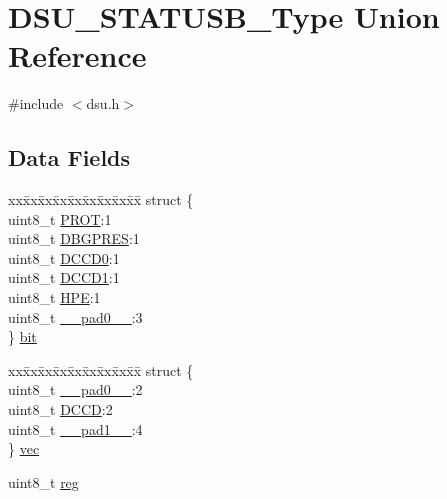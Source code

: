 \hypertarget{union_d_s_u___s_t_a_t_u_s_b___type}{}\section{D\+S\+U\+\_\+\+S\+T\+A\+T\+U\+S\+B\+\_\+\+Type Union Reference}
\label{union_d_s_u___s_t_a_t_u_s_b___type}


{\ttfamily \#include $<$dsu.\+h$>$}

\subsection*{Data Fields}
\begin{DoxyCompactItemize}
\item 
\begin{tabbing}
xx\=xx\=xx\=xx\=xx\=xx\=xx\=xx\=xx\=\kill
struct \{\\
\>uint8\_t \mbox{\hyperlink{union_d_s_u___s_t_a_t_u_s_b___type_a66457368a03947abde79b962839522f1}{PROT}}:1\\
\>uint8\_t \mbox{\hyperlink{union_d_s_u___s_t_a_t_u_s_b___type_a88c9c064c950eeb1f75f17995efa16d4}{DBGPRES}}:1\\
\>uint8\_t \mbox{\hyperlink{union_d_s_u___s_t_a_t_u_s_b___type_ade5e10ab0c9b4e563410c2ca2186fbf4}{DCCD0}}:1\\
\>uint8\_t \mbox{\hyperlink{union_d_s_u___s_t_a_t_u_s_b___type_a4a639c1b4a8423cee0e7758623ba3a56}{DCCD1}}:1\\
\>uint8\_t \mbox{\hyperlink{union_d_s_u___s_t_a_t_u_s_b___type_ae95474c33b0667baa841e73584687093}{HPE}}:1\\
\>uint8\_t \mbox{\hyperlink{union_d_s_u___s_t_a_t_u_s_b___type_a8b4eebe79ded0459acec2f4950102ba3}{\_\_pad0\_\_}}:3\\
\} \mbox{\hyperlink{union_d_s_u___s_t_a_t_u_s_b___type_a40be92d51cf5bb5af73eca9e77cdf001}{bit}}\\

\end{tabbing}\item 
\begin{tabbing}
xx\=xx\=xx\=xx\=xx\=xx\=xx\=xx\=xx\=\kill
struct \{\\
\>uint8\_t \mbox{\hyperlink{union_d_s_u___s_t_a_t_u_s_b___type_a8b4eebe79ded0459acec2f4950102ba3}{\_\_pad0\_\_}}:2\\
\>uint8\_t \mbox{\hyperlink{union_d_s_u___s_t_a_t_u_s_b___type_a0be1ba67b2fad522a310659af793a7bb}{DCCD}}:2\\
\>uint8\_t \mbox{\hyperlink{union_d_s_u___s_t_a_t_u_s_b___type_a77f12d2e278bd5c07712648ac0df5e08}{\_\_pad1\_\_}}:4\\
\} \mbox{\hyperlink{union_d_s_u___s_t_a_t_u_s_b___type_a71bba1c5c155daf1c4e4a2501d8e7461}{vec}}\\

\end{tabbing}\item 
uint8\+\_\+t \mbox{\hyperlink{union_d_s_u___s_t_a_t_u_s_b___type_a9428adc9af4653a2050e2536b55dec8d}{reg}}
\end{DoxyCompactItemize}


